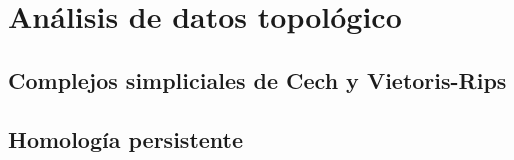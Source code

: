 
\chapter{Análisis de datos topológico}

\section{Complejos simpliciales de Cech y Vietoris-Rips}

\section{Homología persistente}

\endinput
